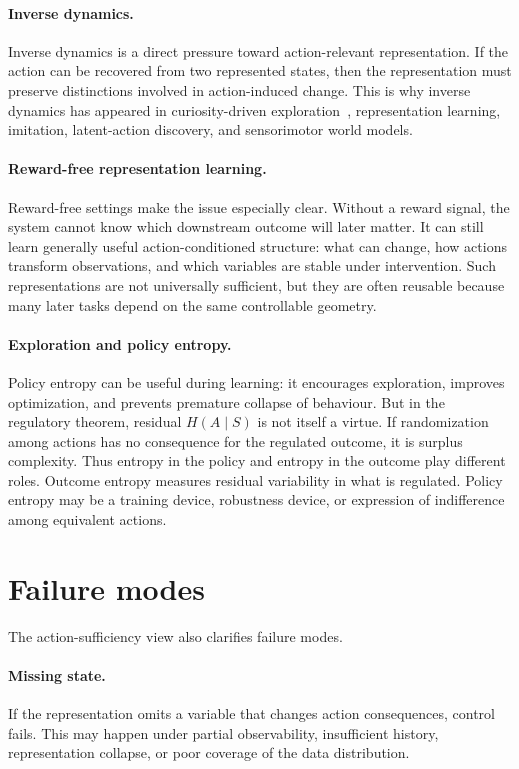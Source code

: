 \documentclass[11pt]{article}
\theoremstyle{remark}
\newcommand{\1}{\mathbb 1}
\begin{document}
\paragraph{Inverse dynamics.}
Inverse dynamics is a direct pressure toward action-relevant representation. If the action can be recovered from two represented states, then the representation must preserve distinctions involved in action-induced change. This is why inverse dynamics has appeared in curiosity-driven exploration~\citep{Pathak-curiosity17}, representation learning, imitation, latent-action discovery, and sensorimotor world models.

\paragraph{Reward-free representation learning.}
Reward-free settings make the issue especially clear. Without a reward signal, the system cannot know which downstream outcome will later matter. It can still learn generally useful action-conditioned structure: what can change, how actions transform observations, and which variables are stable under intervention. Such representations are not universally sufficient, but they are often reusable because many later tasks depend on the same controllable geometry.

\paragraph{Exploration and policy entropy.}
Policy entropy can be useful during learning: it encourages exploration, improves optimization, and prevents premature collapse of behaviour. But in the regulatory theorem, residual $H(A\mid S)$ is not itself a virtue. If randomization among actions has no consequence for the regulated outcome, it is surplus complexity. Thus entropy in the policy and entropy in the outcome play different roles. Outcome entropy measures residual variability in what is regulated. Policy entropy may be a training device, robustness device, or expression of indifference among equivalent actions.

\section{Failure modes}

The action-sufficiency view also clarifies failure modes.

\paragraph{Missing state.}
If the representation omits a variable that changes action consequences, control fails. This may happen under partial observability, insufficient history, representation collapse, or poor coverage of the data distribution.
\end{document}
